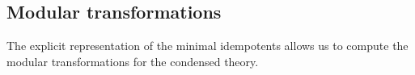 %





\subsection{Modular transformations}
The explicit representation of the minimal idempotents allows us to compute the 
modular transformations for the condensed theory. 

